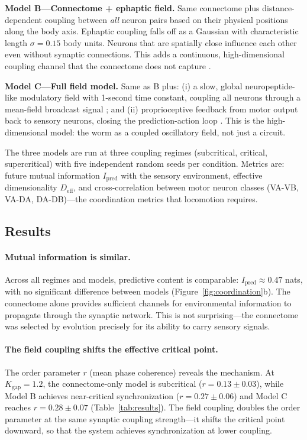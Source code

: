 \documentclass[12pt]{article}
\newcommand{\Deff}{D_{\mathrm{eff}}}
\begin{document}
\textbf{Model B---Connectome + ephaptic field.} Same connectome plus distance-dependent coupling between \textit{all} neuron pairs based on their physical positions along the body axis. Ephaptic coupling falls off as a Gaussian with characteristic length $\sigma = 0.15$ body units. Neurons that are spatially close influence each other even without synaptic connections. This adds a continuous, high-dimensional coupling channel that the connectome does not capture \cite{anastassiou2011}.

\textbf{Model C---Full field model.} Same as B plus: (i) a slow, global neuropeptide-like modulatory field with 1-second time constant, coupling all neurons through a mean-field broadcast signal \cite{bentley2016}; and (ii) proprioceptive feedback from motor output back to sensory neurons, closing the prediction-action loop \cite{wen2012}. This is the high-dimensional model: the worm as a coupled oscillatory field, not just a circuit.

The three models are run at three coupling regimes (subcritical, critical, supercritical) with five independent random seeds per condition. Metrics are: future mutual information $I_{\mathrm{pred}}$ with the sensory environment, effective dimensionality $\Deff$, and cross-correlation between motor neuron classes (VA-VB, VA-DA, DA-DB)---the coordination metrics that locomotion requires.

\subsection{Results}
\label{sec:results}

\paragraph{Mutual information is similar.} Across all regimes and models, predictive content is comparable: $I_{\mathrm{pred}} \approx 0.47$ nats, with no significant difference between models (Figure~\ref{fig:coordination}b). The connectome alone provides sufficient channels for environmental information to propagate through the synaptic network. This is not surprising---the connectome was selected by evolution precisely for its ability to carry sensory signals.

\paragraph{The field coupling shifts the effective critical point.} The order parameter $r$ (mean phase coherence) reveals the mechanism. At $K_{\mathrm{gap}} = 1.2$, the connectome-only model is subcritical ($r = 0.13 \pm 0.03$), while Model B achieves near-critical synchronization ($r = 0.27 \pm 0.06$) and Model C reaches $r = 0.28 \pm 0.07$ (Table~\ref{tab:results}). The field coupling doubles the order parameter at the same synaptic coupling strength---it shifts the critical point downward, so that the system achieves synchronization at lower coupling.
\end{document}
